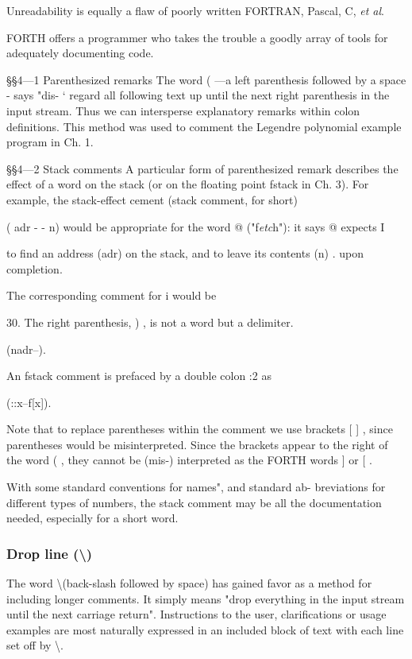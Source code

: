 Unreadability is equally a ﬂaw of poorly written FORTRAN, Pascal, C, \textit{et al}.

FORTH offers a programmer who takes the trouble a goodly
array of tools for adequately documenting code.

§§4—1 Parenthesized remarks
The word ( —a left parenthesis followed by a space - says "dis- ‘
regard all following text up until the next right parenthesis in
the input stream. Thus we can intersperse explanatory remarks
within colon definitions. This method was used to comment the
Legendre polynomial example program in Ch. 1.

§§4—2 Stack comments
A particular form of parenthesized remark describes the effect of
a word on the stack (or on the ﬂoating point fstack in Ch. 3). For
example, the stack-effect cement (stack comment, for short)

( adr - - n)
would be appropriate for the word @ ("f\textit{etc}h"): it says @ expects I

to find an address (adr) on the stack, and to leave its contents (n) .
upon completion.

The corresponding comment for i would be

 

30. The right parenthesis, ) , is not a word but a delimiter.

(nadr--).

An fstack comment is prefaced by a double colon :2 as

(::x--f[x]).

Note that to replace parentheses within the comment we use
brackets [ ] , since parentheses would be misinterpreted. Since
the brackets appear to the right of the word ( , they cannot be
(mis-) interpreted as the FORTH words ] or [ .

With some standard conventions for names", and standard ab-
breviations for different types of numbers, the stack comment
may be all the documentation needed, especially for a short word.

\subsubsection{Drop line (\textbackslash)}
The word \textbackslash (back-slash followed by space) has gained favor as a method for including longer comments. It simply means "drop everything in the input stream until the next carriage return". Instructions to the user, clarifications or usage examples are most naturally expressed in an included block of text with each line set off by \textbackslash .

